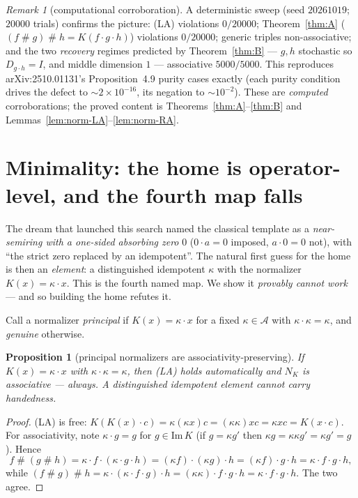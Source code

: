 \documentclass[11pt]{amsart}
\theoremstyle{plain}
\newtheorem{proposition}[theorem]{Proposition}
\theoremstyle{definition}
\theoremstyle{remark}
\newtheorem{remark}[theorem]{Remark}
\newcommand{\Img}{\mathrm{Im}\,}
\newcommand{\sh}{\mathbin{\#}}
\newcommand{\LA}{\textsf{(LA)}}
\begin{document}
\begin{remark}[computational corroboration]
\label{rem:numerics}
A deterministic sweep (seed $20261019$; $20000$ trials) confirms the picture: \LA{} violations
$0/20000$; Theorem~\ref{thm:A} ($(f\sh g)\sh h=K(f\cdot g\cdot h)$) violations $0/20000$; generic
triples non-associative; and the two \emph{recovery} regimes predicted by Theorem~\ref{thm:B} ---
$g,h$ stochastic so $D_{g\cdot h}=I$, and middle dimension $1$ --- associative $5000/5000$. This
reproduces arXiv:2510.01131's Proposition~4.9 purity cases exactly (each purity condition drives the
defect to $\sim 2\times10^{-16}$, its negation to $\sim 10^{-2}$). These are \emph{computed}
corroborations; the proved content is Theorems~\ref{thm:A}--\ref{thm:B} and
Lemmas~\ref{lem:norm-LA}--\ref{lem:norm-RA}.
\end{remark}

\section{Minimality: the home is operator-level, and the fourth map falls}
\label{sec:minimal}

The dream that launched this search named the classical template as a \emph{near-semiring with a
one-sided absorbing zero} $0$ ($0\cdot a=0$ imposed, $a\cdot 0=0$ not), with ``the strict zero replaced
by an idempotent''. The natural first guess for the home is then an \emph{element}: a distinguished
idempotent $\kappa$ with the normalizer $K(x)=\kappa\cdot x$. This is the fourth named map. We show it
\emph{provably cannot work} --- and so building the home refutes it.

Call a normalizer \emph{principal} if $K(x)=\kappa\cdot x$ for a fixed $\kappa\in\mathcal{A}$ with
$\kappa\cdot\kappa=\kappa$, and \emph{genuine} otherwise.

\begin{proposition}[principal normalizers are associativity-preserving]
\label{prop:principal}
If $K(x)=\kappa\cdot x$ with $\kappa\cdot\kappa=\kappa$, then \LA{} holds automatically \emph{and}
$N_{K}$ is \emph{associative} --- always. A distinguished idempotent \emph{element} cannot carry
handedness.
\end{proposition}
\begin{proof}
\LA{} is free: $K(K(x)\cdot c)=\kappa(\kappa x)c=(\kappa\kappa)xc=\kappa xc=K(x\cdot c)$. For
associativity, note $\kappa\cdot g=g$ for $g\in\Img K$ (if $g=\kappa g'$ then
$\kappa g=\kappa\kappa g'=\kappa g'=g$). Hence
\[
  f\sh(g\sh h)=\kappa\cdot f\cdot(\kappa\cdot g\cdot h)=(\kappa f)\cdot(\kappa g)\cdot h
     =(\kappa f)\cdot g\cdot h=\kappa\cdot f\cdot g\cdot h,
\]
while $(f\sh g)\sh h=\kappa\cdot(\kappa\cdot f\cdot g)\cdot h=(\kappa\kappa)\cdot f\cdot g\cdot h
=\kappa\cdot f\cdot g\cdot h$. The two agree.
\end{proof}
\end{document}

